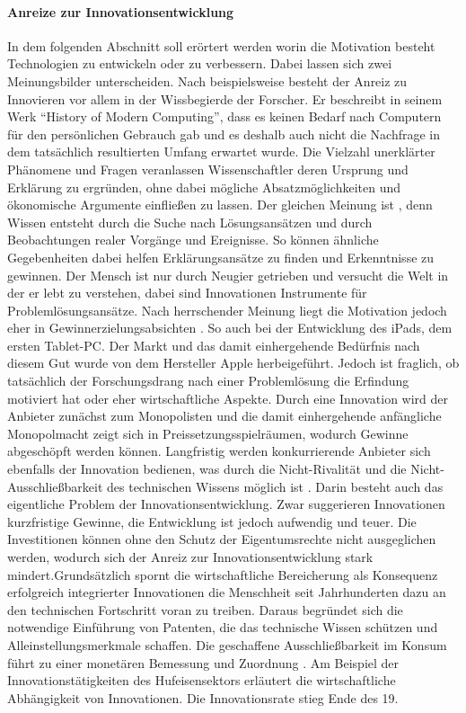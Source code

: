 \paragraph{Anreize zur Innovationsentwicklung}\label{sec:Anreize}
In dem folgenden Abschnitt soll erörtert werden worin die Motivation besteht Technologien zu entwickeln oder zu verbessern. Dabei lassen sich zwei Meinungsbilder unterscheiden.  Nach \citet{Ceruzzi.2003} beispielsweise besteht der Anreiz zu Innovieren vor allem in der Wissbegierde der Forscher. Er beschreibt in seinem Werk "`History of Modern Computing"', dass es keinen Bedarf nach Computern f{\"u}r den pers{\"o}nlichen Gebrauch gab und es deshalb auch nicht die Nachfrage in dem tats{\"a}chlich resultierten Umfang erwartet wurde. Die Vielzahl unerkl{\"a}rter Ph{\"a}nomene und Fragen veranlassen Wissenschaftler deren Ursprung und Erkl{\"a}rung zu ergr{\"u}nden, ohne dabei mögliche Absatzmöglichkeiten und ökonomische Argumente einflie{\ss}en zu lassen. Der gleichen Meinung ist \citet{Arrow.1969}, denn Wissen entsteht durch die Suche nach L{\"o}sungsans{\"a}tzen und durch Beobachtungen realer Vorg{\"a}nge und Ereignisse. So können ähnliche Gegebenheiten dabei helfen Erkl{\"a}rungsans{\"a}tze zu finden und Erkenntnisse zu gewinnen. Der Mensch ist nur durch Neugier getrieben und versucht die Welt in der er lebt zu verstehen, dabei sind Innovationen Instrumente für Problemlösungsansätze. \newline Nach herrschender Meinung liegt die Motivation jedoch eher in Gewinnerzielungsabsichten \citep{Romer.1993,Grossman1989b.}. So auch bei der Entwicklung des iPads, dem ersten Tablet-PC. Der Markt und das damit einhergehende Bedürfnis nach diesem Gut wurde von dem Hersteller Apple herbeigeführt. Jedoch ist fraglich, ob tatsächlich der Forschungsdrang nach einer Problemlösung die Erfindung motiviert hat oder eher wirtschaftliche Aspekte. Durch eine Innovation wird der Anbieter zunächst zum Monopolisten und die damit einhergehende anfängliche Monopolmacht zeigt sich in Preissetzungsspielräumen, wodurch Gewinne abgeschöpft werden können. Langfristig werden konkurrierende Anbieter sich ebenfalls der Innovation bedienen, was durch die Nicht-Rivalität und die Nicht-Ausschlie{\ss}barkeit des technischen Wissens möglich ist \citep{Romer.1993}. Darin besteht auch das eigentliche Problem der Innovationsentwicklung. Zwar suggerieren Innovationen kurzfristige Gewinne, die Entwicklung ist jedoch aufwendig und teuer. Die Investitionen können ohne den Schutz der Eigentumsrechte nicht ausgeglichen werden, wodurch sich der Anreiz zur Innovationsentwicklung stark mindert.Grundsätzlich spornt die wirtschaftliche Bereicherung als Konsequenz erfolgreich integrierter Innovationen die Menschheit seit Jahrhunderten dazu an den technischen Fortschritt voran zu treiben. Daraus begründet sich die notwendige Einf{\"u}hrung von Patenten, die das technische Wissen sch{\"u}tzen und Alleinstellungsmerkmale schaffen. Die geschaffene Ausschlie{\ss}barkeit im Konsum f{\"u}hrt zu einer monet{\"a}ren Bemessung und Zuordnung \citep{Acemoglu.2009}. Am Beispiel der Innovationst{\"a}tigkeiten des Hufeisensektors erläutert \citet{Schmookler.1966} die wirtschaftliche Abhängigkeit von Innovationen. Die Innovationsrate stieg Ende des 19. 